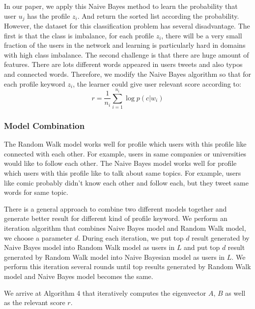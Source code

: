 \documentclass{article}
\begin{document}
In our paper, we apply this Naive Bayes method to learn the probability that user $u_j$ has the profile $z_i$. And return the sorted list according the probability.
However, the dataset for this classification problem has several disadvantage. The first is that the class is imbalance, for each profile $z_i$, there will be a very small fraction of the users in the network and learning is particularly hard in domains with high class imbalance. The second challenge is that there are huge amount of features. There are lots different words appeared in users tweets and also typos and connected words. Therefore, we modify the Naive Bayes algorithm so that for each profile keyword $z_i$, the learner could give user relevant score according to:
$$r = \frac{1}{n_i}\sum_{i=1}^{n_i} \log p(c|w_i)$$

\subsubsection{Model Combination}
The Random Walk model works well for profile which users with this profile like connected with each other. For example, users in same companies or universities would like to follow each other. The Naive Bayes model works well for profile which users with this profile like to talk about same topics. For example, users like comic probably didn't know each other and follow each, but they tweet same words for same topic.

There is a general approach to combine two different models together and generate better result for different kind of profile keyword.
We perform an iteration algorithm that combines Naive Bayes model and Random Walk model, we choose a parameter $d$. During each iteration, we put top $d$ result generated by Naive Bayes model into Random Walk model as users in $L$ and put top $d$ result generated by Random Walk model into Naive Bayesian model as users in $L$. We perform this iteration several rounds until top results generated by Random Walk model and Naive Bayes model becomes the same.

We arrive at Algorithm 4 that iteratively computes the eigenvector $A$, $B$ as well as the relevant score $r$.

\ifx \allfiles \undefined
\end{document}

